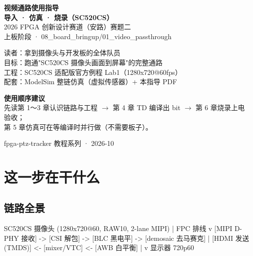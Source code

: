 \documentclass[11pt]{ctexart}
\begin{document}
\begin{titlepage}
\centering
\vspace*{2.2cm}
{\color{deep}\Huge\bfseries 视频通路使用指导}\\[6pt]
{\color{deep}\Large\bfseries 导入 · 仿真 · 烧录（SC520CS）}\\[14pt]
{\large 2026 FPGA 创新设计赛道（安路）赛题二}\\[6pt]
{\large 上板阶段 · 08\_board\_bringup/01\_video\_passthrough}\\[20pt]

\begin{tcolorbox}[enhanced, colback=codebg, colframe=accent, boxrule=0.8pt,
  arc=2mm, width=12.5cm, left=4mm, right=4mm, top=3mm, bottom=3mm]
\centering
{\small 读者：拿到摄像头与开发板的全体队员\\
目标：跑通"SC520CS 摄像头画面到屏幕"的完整通路\\
工程：SC520CS 适配版官方例程 Lab1（1280x720@60fps）\\
配套：ModelSim 整链仿真（虚拟传感器）+ 本指导 PDF}
\end{tcolorbox}

\vspace{8mm}
\begin{tcolorbox}[enhanced, colback=tipbg, colframe=tipline, boxrule=0.5pt,
  arc=2mm, width=12.5cm, left=4mm, right=4mm, top=2mm, bottom=2mm]
\centering
{\small\color{deep} \textbf{使用顺序建议}\\
先读第 1～3 章认识链路与工程 $\rightarrow$ 第 4 章 TD 编译出 bit
$\rightarrow$ 第 6 章烧录上电验收；\\
第 5 章仿真可在等编译时并行做（不需要板子）。}
\end{tcolorbox}

\vfill
{\small\color{black!50} fpga-ptz-tracker 教程系列 · 2026-10}
\end{titlepage}

\tableofcontents
\newpage

\section{这一步在干什么}

\subsection{链路全景}

\begin{Verilog}
SC520CS 摄像头 (1280x720@60, RAW10, 2-lane MIPI)
   |  FPC 排线
   v
[MIPI D-PHY 接收]  -> [CSI 解包] -> [BLC 黑电平] -> [demosaic 去马赛克]
                                                    |
                       [HDMI 发送 (TMDS)] <- [mixer/VTC] <- [AWB 白平衡]
                              |
                              v
                          显示器 720p60
\end{Verilog}
\end{document}
